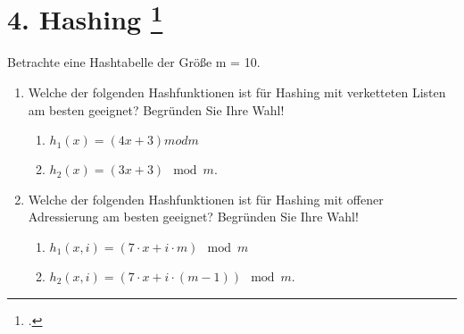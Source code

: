 \documentclass{lehramt-informatik-aufgabe}
\begin{document}
\section{4. Hashing
\footcite[Thema 2 Aufgabe 4 Seite 7]{examen:66115:2016:03}}

Betrachte eine Hashtabelle der Größe m = 10.

\begin{enumerate}


\item Welche der folgenden Hashfunktionen ist für Hashing mit
verketteten Listen am besten geeignet? Begründen Sie Ihre Wahl!

\begin{enumerate}
\item $h_1(x) = (4x + 3) mod m$
\item $h_2(x) = (3x + 3) \mod m$.
\end{enumerate}


\item Welche der folgenden Hashfunktionen ist für Hashing mit offener
Adressierung am besten geeignet? Begründen Sie Ihre Wahl!

\begin{enumerate}
\item $h_1(x,i) = (7 \cdot x + i \cdot m) \mod m$
\item $h_2(x,i) = (7 \cdot x + i \cdot (m - 1)) \mod m$.
\end{enumerate}
\end{enumerate}
\end{document}
